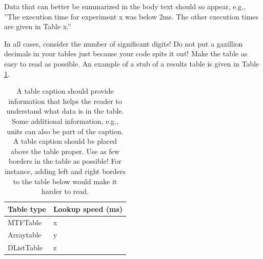 \documentclass{article}
\begin{document}
Data that can better be summarized in the body text should so appear,
e.g., ''The execution time for experiment x was below 2ms. The other
execution times are given in Table x.''

In all cases, consider the number of significant digits! Do not put a
gazillion decimals in your tables just because your code spits it out!
Make the table as easy to read as possible. An example of a stub of a
results table is given in Table \ref{tab:time-table}.

\begin{table}[tbp]
\caption{\label{tab:time-table}A table caption should provide information that helps the reader to understand what data is in the table. Some additional information, e.g., units can also be part of the caption. A table caption should be placed above the table proper. Use as few borders in the table as possible! For instance, adding left and right borders to the table below would make it harder to read.}
\centering
\begin{tabular}{l|l}
\textbf{Table type} & Lookup speed (ms)\\
\hline
MTFTable & x\\
Arraytable & y\\
DListTable & z\\
\end{tabular}
\end{table}
\end{document}
